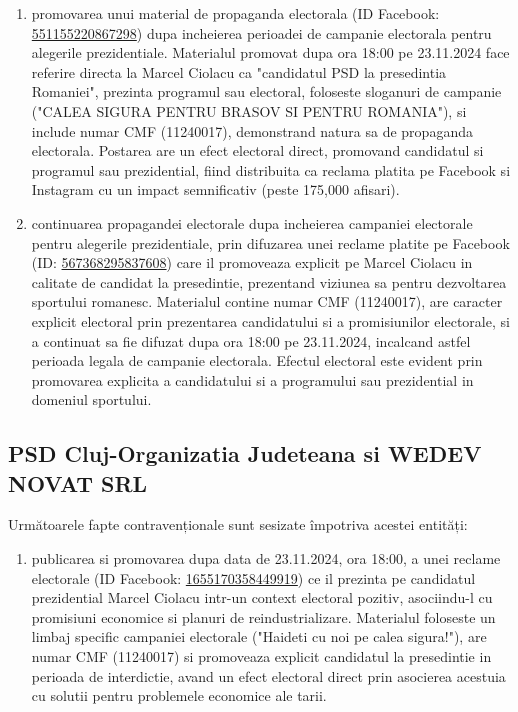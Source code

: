 \documentclass[a4paper,12pt]{article}
\begin{document}
\begin{enumerate}[leftmargin=*, label=\arabic*.)]
    \item promovarea unui material de propaganda electorala (ID Facebook: \href{https://www.facebook.com/ads/library/?id=551155220867298}{551155220867298}) dupa incheierea perioadei de campanie electorala pentru alegerile prezidentiale. Materialul promovat dupa ora 18:00 pe 23.11.2024 face referire directa la Marcel Ciolacu ca "candidatul PSD la presedintia Romaniei", prezinta programul sau electoral, foloseste sloganuri de campanie ("CALEA SIGURA PENTRU BRASOV SI PENTRU ROMANIA"), si include numar CMF (11240017), demonstrand natura sa de propaganda electorala. Postarea are un efect electoral direct, promovand candidatul si programul sau prezidential, fiind distribuita ca reclama platita pe Facebook si Instagram cu un impact semnificativ (peste 175,000 afisari).
    \item continuarea propagandei electorale dupa incheierea campaniei electorale pentru alegerile prezidentiale, prin difuzarea unei reclame platite pe Facebook (ID: \href{https://www.facebook.com/ads/library/?id=567368295837608}{567368295837608}) care il promoveaza explicit pe Marcel Ciolacu in calitate de candidat la presedintie, prezentand viziunea sa pentru dezvoltarea sportului romanesc. Materialul contine numar CMF (11240017), are caracter explicit electoral prin prezentarea candidatului si a promisiunilor electorale, si a continuat sa fie difuzat dupa ora 18:00 pe 23.11.2024, incalcand astfel perioada legala de campanie electorala. Efectul electoral este evident prin promovarea explicita a candidatului si a programului sau prezidential in domeniul sportului.
\end{enumerate}

\vspace{0.5cm}

\subsection{PSD Cluj-Organizatia Judeteana si WEDEV NOVAT SRL}
Următoarele fapte contravenționale sunt sesizate împotriva acestei entități:

\begin{enumerate}[leftmargin=*, label=\arabic*.)]
    \item publicarea si promovarea dupa data de 23.11.2024, ora 18:00, a unei reclame electorale (ID Facebook: \href{https://www.facebook.com/ads/library/?id=1655170358449919}{1655170358449919}) ce il prezinta pe candidatul prezidential Marcel Ciolacu intr-un context electoral pozitiv, asociindu-l cu promisiuni economice si planuri de reindustrializare. Materialul foloseste un limbaj specific campaniei electorale ("Haideti cu noi pe calea sigura!"), are numar CMF (11240017) si promoveaza explicit candidatul la presedintie in perioada de interdictie, avand un efect electoral direct prin asocierea acestuia cu solutii pentru problemele economice ale tarii.
\end{enumerate}
\end{document}

